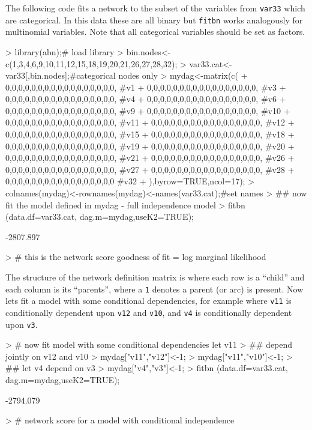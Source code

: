 \documentclass[nojss]{jss}
\begin{document}
The following code fits a network to the subset of the variables from {\tt var33} which are categorical. In this data these are all binary but {\tt fitbn} works analogously for multinomial variables. Note that all categorical variables should be set as factors.     
\begin{Schunk}
\begin{Sinput}
> library(abn);# load library
> bin.nodes<-c(1,3,4,6,9,10,11,12,15,18,19,20,21,26,27,28,32); 
> var33.cat<-var33[,bin.nodes];#categorical nodes only
> mydag<-matrix(c(
+                  0,0,0,0,0,0,0,0,0,0,0,0,0,0,0,0,0, #v1
+                  0,0,0,0,0,0,0,0,0,0,0,0,0,0,0,0,0, #v3
+                  0,0,0,0,0,0,0,0,0,0,0,0,0,0,0,0,0, #v4  
+                  0,0,0,0,0,0,0,0,0,0,0,0,0,0,0,0,0, #v6  
+                  0,0,0,0,0,0,0,0,0,0,0,0,0,0,0,0,0, #v9  
+                  0,0,0,0,0,0,0,0,0,0,0,0,0,0,0,0,0, #v10  
+                  0,0,0,0,0,0,0,0,0,0,0,0,0,0,0,0,0, #v11  
+                  0,0,0,0,0,0,0,0,0,0,0,0,0,0,0,0,0, #v12  
+                  0,0,0,0,0,0,0,0,0,0,0,0,0,0,0,0,0, #v15  
+                  0,0,0,0,0,0,0,0,0,0,0,0,0,0,0,0,0, #v18 
+                  0,0,0,0,0,0,0,0,0,0,0,0,0,0,0,0,0, #v19
+                  0,0,0,0,0,0,0,0,0,0,0,0,0,0,0,0,0, #v20 
+                  0,0,0,0,0,0,0,0,0,0,0,0,0,0,0,0,0, #v21 
+                  0,0,0,0,0,0,0,0,0,0,0,0,0,0,0,0,0, #v26 
+                  0,0,0,0,0,0,0,0,0,0,0,0,0,0,0,0,0, #v27 
+                  0,0,0,0,0,0,0,0,0,0,0,0,0,0,0,0,0, #v28 
+                  0,0,0,0,0,0,0,0,0,0,0,0,0,0,0,0,0  #v32 
+               ),byrow=TRUE,ncol=17); 
> colnames(mydag)<-rownames(mydag)<-names(var33.cat);#set names
> ## now fit the model defined in mydag - full independence model
> fitbn (data.df=var33.cat, dag.m=mydag,useK2=TRUE);
\end{Sinput}
\begin{Soutput}
[1] -2807.897
\end{Soutput}
\begin{Sinput}
> # this is the network score goodness of fit = log marginal likelihood
\end{Sinput}
\end{Schunk}
The structure of the network definition matrix is where each row is a ``child'' and each column is its ``parents'', where a {\tt 1} denotes a parent (or arc) is present. Now lets fit a model with some conditional dependencies, for example where {\tt v11} is conditionally dependent upon {\tt v12} and {\tt v10}, and {\tt v4} is conditionally dependent upon {\tt v3}.
\begin{Schunk}
\begin{Sinput}
> # now fit model with some conditional dependencies let v11 
> ## depend jointly on v12 and v10
> mydag["v11","v12"]<-1;
> mydag["v11","v10"]<-1;
> ## let v4 depend on v3
> mydag["v4","v3"]<-1;
> fitbn (data.df=var33.cat, dag.m=mydag,useK2=TRUE);
\end{Sinput}
\begin{Soutput}
[1] -2794.079
\end{Soutput}
\begin{Sinput}
> # network score for a model with conditional independence
\end{Sinput}
\end{Schunk}
\end{document}
